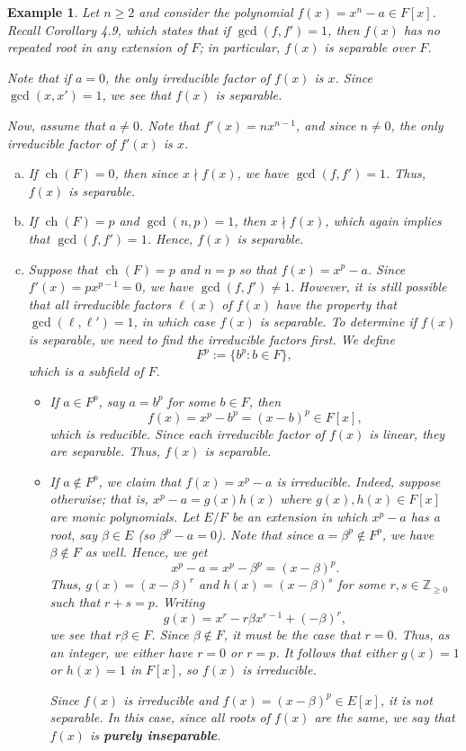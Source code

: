 \documentclass[10pt]{article}
\newcommand{\Z}{\mathbb{Z}}
\DeclareMathOperator{\ch}{ch}
\theoremstyle{newstyle}
\newtheorem{exmp}[thm]{Example}
\begin{document}
\begin{exmp}
Let $n \geq 2$ and consider the polynomial $f(x) = x^n - a \in F[x]$. Recall Corollary 4.9, 
which states that if $\gcd(f, f') = 1$, then $f(x)$ has no repeated root in any extension of $F$;
in particular, $f(x)$ is separable over $F$. 

Note that if $a = 0$, the only irreducible factor of $f(x)$ is $x$. Since $\gcd(x, x') = 1$, 
we see that $f(x)$ is separable. 

Now, assume that $a \neq 0$. Note that $f'(x) = nx^{n-1}$, and since $n \neq 0$, the only 
irreducible factor of $f'(x)$ is $x$.
\begin{enumerate}[(a)]
    \item If $\ch(F) = 0$, then since $x \nmid f(x)$, we have $\gcd(f, f') = 1$. Thus, 
    $f(x)$ is separable. 
    \item If $\ch(F) = p$ and $\gcd(n, p) = 1$, then $x \nmid f(x)$, which again implies that 
    $\gcd(f, f') = 1$. Hence, $f(x)$ is separable. 
    \item Suppose that $\ch(F) = p$ and $n = p$ so that $f(x) = x^p - a$. 
    Since $f'(x) = px^{p-1} = 0$, we have $\gcd(f, f') \neq 1$. However, it is still 
    possible that all irreducible factors $\ell(x)$ of $f(x)$ have the property that 
    $\gcd(\ell, \ell') = 1$, in which case $f(x)$ is separable. To determine if $f(x)$ is separable,
    we need to find the irreducible factors first. We define 
    \[ F^p := \{b^p : b \in F\}, \] 
    which is a subfield of $F$. 
    \begin{itemize}
        \item If $a \in F^p$, say $a = b^p$ for some $b \in F$, then 
        \[ f(x) = x^p - b^p = (x-b)^p \in F[x], \]
        which is reducible. Since each irreducible factor of $f(x)$ is linear, they are separable. 
        Thus, $f(x)$ is separable.
        \item If $a \notin F^p$, we claim that $f(x) = x^p - a$ is irreducible. 
        Indeed, suppose otherwise; that is, $x^p - a = g(x)h(x)$ where $g(x), h(x) \in F[x]$ 
        are monic polynomials. Let $E/F$ be an extension in which $x^p - a$ has a 
        root, say $\beta \in E$ (so $\beta^p - a = 0$). Note that since $a = \beta^p 
        \notin F^p$, we have $\beta \notin F$ as well. Hence, we get 
        \[ x^p - a = x^p - \beta^p = (x-\beta)^p. \]
        Thus, $g(x) = (x-\beta)^r$ and $h(x) = (x-\beta)^s$ for some $r, s \in \Z_{\geq0}$ 
        such that $r+s = p$. Writing 
        \[ g(x) = x^r - r\beta x^{r-1} + (-\beta)^r, \]
        we see that $r\beta \in F$. Since $\beta \notin F$, it must be the case that 
        $r = 0$. Thus, as an integer, we either have $r = 0$ or $r = p$. 
        It follows that either $g(x) = 1$ or $h(x) = 1$ in $F[x]$, so $f(x)$ 
        is irreducible. 
        
        Since $f(x)$ is irreducible and $f(x) = (x-\beta)^p \in E[x]$, it is not separable. 
        In this case, since all roots of $f(x)$ are the same, we say that $f(x)$ is 
        {\bf purely inseparable}. 
    \end{itemize}
\end{enumerate}
\end{exmp}
\end{document}
